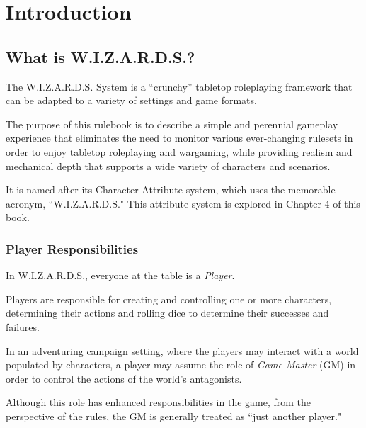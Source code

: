 
\chapter{Introduction}


\section{What is W.I.Z.A.R.D.S.?}
The W.I.Z.A.R.D.S. System is a ``crunchy'' tabletop roleplaying framework 
that can be adapted to a variety of settings and game formats. 

\vspace{0.4em}

The purpose of this rulebook is to describe a 
simple and perennial gameplay experience that
eliminates the need to monitor various ever-changing rulesets 
in order to enjoy tabletop roleplaying and wargaming,
while providing realism and mechanical depth that supports a wide 
variety of characters and scenarios.

\vspace{0.4em}

It is named after its Character Attribute system, 
which uses the memorable acronym, ``W.I.Z.A.R.D.S."
This attribute system is explored in Chapter 4 of this book.



\subsection{Player Responsibilities}
In W.I.Z.A.R.D.S., everyone at the table is a \textit{Player}. 

\vspace{0.4em}

Players are responsible for creating and controlling one or more characters,
determining their actions and rolling dice to determine their 
successes and failures.

\vspace{0.4em}

In an adventuring campaign setting, 
where the players may interact with a world populated by characters,
a player may assume the role of \textit{Game Master} (GM)
in order to control the actions of the world's antagonists.

Although this role has enhanced responsibilities in the game, 
from the perspective of the rules, 
the GM is generally treated as ``just another player."

\vspace{0.4em}

